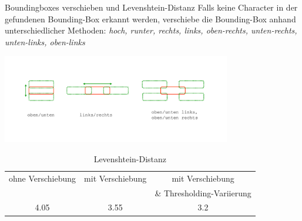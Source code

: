\begin{frame}{Boundingboxes verschieben und Levenshtein-Distanz}
Falls keine Character in der gefundenen Bounding-Box erkannt werden, verschiebe die Bounding-Box anhand unterschiedlicher Methoden: {\textit{hoch, runter, rechts, links, oben-rechts, unten-rechts, unten-links, oben-links}}
\begin{center}
    \includegraphics[width=0.75\textwidth]{img/bbox_shift}
\end{center}
\begin{table}[H]
\begin{tabular}{ccc}
\centering
\caption{Levenshtein-Distanz}
ohne Verschiebung        & mit Verschiebung         & mit Verschiebung
          \\
                         &                          & \&
Thresholding-Variierung \\
4.05 & 3.55 & 3.2
\end{tabular}
\end{table}
\end{frame}

